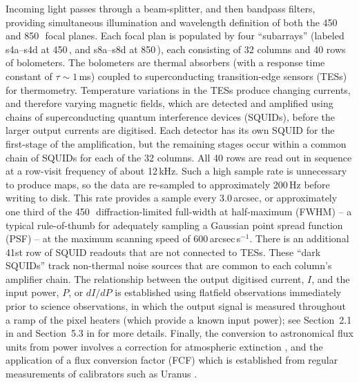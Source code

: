 \documentclass[useAMS,usenatbib,nofootinbib]{mn2e}
\begin{document}
Incoming light passes through a beam-splitter, and then bandpass
filters, providing simultaneous illumination and wavelength definition
of both the 450 and 850\,\micron\ focal planes. Each focal plan is
populated by four ``subarrays'' (labeled s4a--s4d at 450\,\micron, and
s8a--s8d at 850\,\micron), each consisting of 32 columns and 40 rows
of bolometers. The bolometers are thermal absorbers (with a response
time constant of $\tau \sim 1$\,ms) coupled to superconducting
transition-edge sensors (TESs) for thermometry. Temperature variations
in the TESs produce changing currents, and therefore varying magnetic
fields, which are detected and amplified using chains of
superconducting quantum interference devices (SQUIDs), before the
larger output currents are digitised. Each detector has its own SQUID
for the first-stage of the amplification, but the remaining stages
occur within a common chain of SQUIDs for each of the 32 columns. All
40 rows are read out in sequence at a row-visit frequency of about
12\,kHz. Such a high sample rate is unnecessary to produce maps, so
the data are re-sampled to approximately 200\,Hz before writing to
disk. This rate provides a sample every 3.0\,arcsec, or approximately
one third of the 450\,\micron\ diffraction-limited full-width at
half-maximum (FWHM) -- a typical rule-of-thumb for adequately sampling
a Gaussian point spread function (PSF) -- at the maximum scanning
speed of 600\,arcsec\,s$^{-1}$. There is an additional 41st row of
SQUID readouts that are not connected to TESs. These ``dark SQUIDs''
track non-thermal noise sources that are common to each column's
amplifier chain. The relationship between the output digitised
current, $I$, and the input power, $P$, or $dI/dP$ is established
using flatfield observations immediately prior to science
observations, in which the output signal is measured throughout a ramp
of the pixel heaters (which provide a known input power); see
Section~2.1 in \citet{dempsey2012} and Section~5.3 in
\citet{holland2012} for more details. Finally, the conversion to
astronomical flux units from power involves a correction for
atmospheric extinction \citep[primarily using the JCMT Water Vapour
Monitor to track line-of-sight opacity variations, see Section~3
in][]{dempsey2012}, and the application of a flux conversion factor
(FCF) which is established from regular measurements of calibrators
such as Uranus \citep[Section~5 in][]{dempsey2012}.
\end{document}
